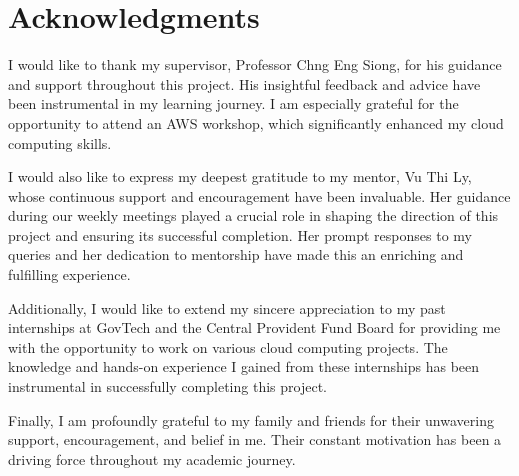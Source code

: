 \chapter*{Acknowledgments}

I would like to thank my supervisor, Professor Chng Eng Siong, for his guidance and support throughout this project. His insightful feedback and advice have been instrumental in my learning journey. I am especially grateful for the opportunity to attend an AWS workshop, which significantly enhanced my cloud computing skills. 

I would also like to express my deepest gratitude to my mentor, Vu Thi Ly, whose continuous support and encouragement have been invaluable. Her guidance during our weekly meetings played a crucial role in shaping the direction of this project and ensuring its successful completion. Her prompt responses to my queries and her dedication to mentorship have made this an enriching and fulfilling experience.

Additionally, I would like to extend my sincere appreciation to my past internships at GovTech and the Central Provident Fund Board for providing me with the opportunity to work on various cloud computing projects. The knowledge and hands-on experience I gained from these internships has been instrumental in successfully completing this project.

Finally, I am profoundly grateful to my family and friends for their unwavering support, encouragement, and belief in me. Their constant motivation has been a driving force throughout my academic journey.
